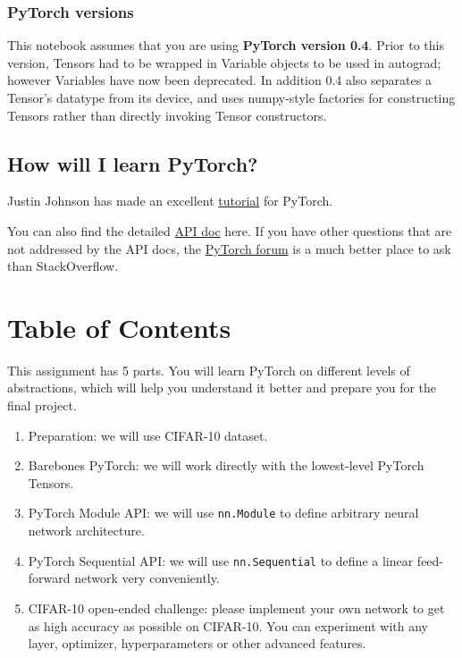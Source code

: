 \documentclass[11pt]{article}
\providecommand{\tightlist}{%
      \setlength{\itemsep}{0pt}\setlength{\parskip}{0pt}}
\begin{document}
\subsubsection{PyTorch versions}\label{pytorch-versions}

This notebook assumes that you are using \textbf{PyTorch version 0.4}.
Prior to this version, Tensors had to be wrapped in Variable objects to
be used in autograd; however Variables have now been deprecated. In
addition 0.4 also separates a Tensor's datatype from its device, and
uses numpy-style factories for constructing Tensors rather than directly
invoking Tensor constructors.

    \subsection{How will I learn PyTorch?}\label{how-will-i-learn-pytorch}

Justin Johnson has made an excellent
\href{https://github.com/jcjohnson/pytorch-examples}{tutorial} for
PyTorch.

You can also find the detailed
\href{http://pytorch.org/docs/stable/index.html}{API doc} here. If you
have other questions that are not addressed by the API docs, the
\href{https://discuss.pytorch.org/}{PyTorch forum} is a much better
place to ask than StackOverflow.

\section{Table of Contents}\label{table-of-contents}

This assignment has 5 parts. You will learn PyTorch on different levels
of abstractions, which will help you understand it better and prepare
you for the final project.

\begin{enumerate}
\def\labelenumi{\arabic{enumi}.}
\tightlist
\item
  Preparation: we will use CIFAR-10 dataset.
\item
  Barebones PyTorch: we will work directly with the lowest-level PyTorch
  Tensors.
\item
  PyTorch Module API: we will use \texttt{nn.Module} to define arbitrary
  neural network architecture.
\item
  PyTorch Sequential API: we will use \texttt{nn.Sequential} to define a
  linear feed-forward network very conveniently.
\item
  CIFAR-10 open-ended challenge: please implement your own network to
  get as high accuracy as possible on CIFAR-10. You can experiment with
  any layer, optimizer, hyperparameters or other advanced features.
\end{enumerate}
\end{document}
